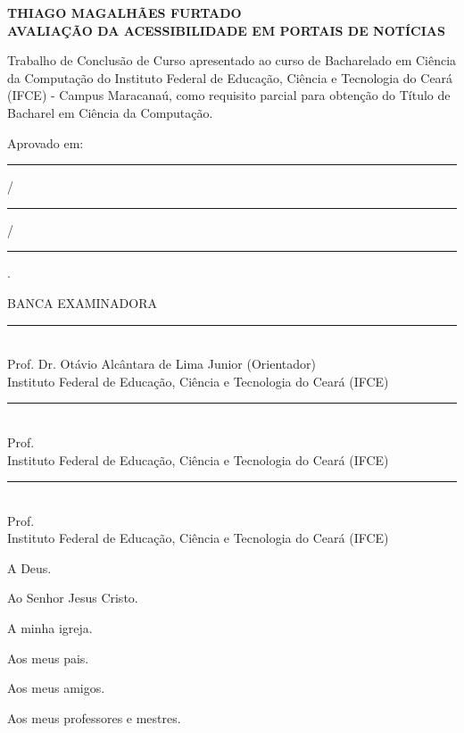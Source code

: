 \documentclass[a4paper]{article}
\begin{document}
\begin{titlepage}
	\vfill
	\begin{center}
		\onehalfspacing
		\fontsize{12pt}{0pt}\selectfont
		{\large \textbf{THIAGO MAGALHÃES FURTADO}} \\[1.5cm]
		\fontsize{12pt}{0pt}\selectfont
		{\large \textbf{AVALIAÇÃO DA ACESSIBILIDADE EM PORTAIS DE NOTÍCIAS}}\\[3cm]
		
		\hspace{.45\textwidth} %
		\begin{minipage}{.5\textwidth}
			\large Trabalho de Conclusão de Curso apresentado ao curso de Bacharelado em Ciência da Computação do Instituto Federal de Educação, Ciência e Tecnologia do Ceará (IFCE) - Campus Maracanaú, como requisito parcial para obtenção do Título de Bacharel em Ciência da Computação.\\[1cm]
		\end{minipage}
	\end{center}
	
	Aprovado em:  \rule{1cm}{0.01cm} /\rule{1cm}{0.01cm} /\rule{1cm}{0.01cm}.\\[0.5cm]
	
	\begin{center}
		\onehalfspacing
		\fontsize{12pt}{0pt}\selectfont
		{\large{BANCA EXAMINADORA}}\\[1cm]
		\rule{13cm}{0.01cm}\\[0.1cm]
		Prof. Dr. Otávio Alcântara de Lima Junior (Orientador)\\[0.1cm]
		Instituto Federal de Educação, Ciência e Tecnologia do Ceará (IFCE)\\[1.5cm]
		\rule{13cm}{0.01cm}\\[0.1cm]
		Prof. \\[0.1cm]
		Instituto Federal de Educação, Ciência e Tecnologia do Ceará (IFCE)\\[1.5cm]
		\rule{13cm}{0.01cm}\\[0.1cm]
		Prof. \\[0.1cm]
		Instituto Federal de Educação, Ciência e Tecnologia do Ceará (IFCE)\\
	\end{center}
\end{titlepage}

\begin{titlepage}
	
	\hfill \parbox{7.5cm}{A Deus.}
	
	\hfill \parbox{7.5cm}{Ao Senhor Jesus Cristo.}
	
	\hfill \parbox{7.5cm}{A minha igreja.}
	
	\hfill \parbox{7.5cm}{Aos meus pais.}

	\hfill \parbox{7.5cm}{Aos meus amigos.}
	
	\hfill \parbox{7.5cm}{Aos meus professores e mestres.}
\end{titlepage}
\end{document}
